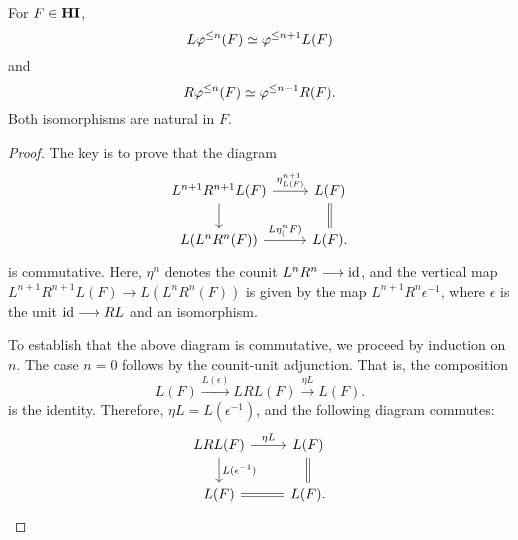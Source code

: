 \begin{prop}\label{prop_tl_L_R}
For $F \in \mathbf{HI}$, 
\[
L \varphi^{\leq n}(F) \simeq \varphi^{\leq n + 1} L(F)
\]
and
\[
R\varphi^{\leq n}(F) \simeq \varphi^{\leq n - 1}R(F).
\] 
Both isomorphisms are natural in $F$.
\end{prop}
\begin{proof}
The key is to prove that the diagram
\begin{equation}\label{eq_Ltl_com_diag}
\begin{tikzcd}
L^{n + 1}R^{n + 1}L(F) \arrow{r}{\eta^{n + 1}_{L(F)}} \arrow{d} &
L(F) \arrow[equals]{d} \\
L(L^{n}R^n(F)) \arrow{r}{L\eta^{n}_(F)} &
L(F).
\end{tikzcd}
\end{equation}
is commutative. Here, $\eta^n$ denotes the counit $L^nR^n \longrightarrow \mathrm{id}$,
and the vertical map $L^{n + 1}R^{n + 1}L(F) \to L(L^nR^n (F))$ is 
given by the map $L^{n + 1}R^n \epsilon^{-1}$, where $\epsilon$ is
the unit $\mathrm{id} \longrightarrow RL$ and an isomorphism.

To establish that the above diagram is commutative, we proceed by 
induction on $n$. The case $n = 0$ follows by the counit-unit 
adjunction. That is, the composition
\[
L(F) \stackrel{L(\epsilon)}{\to} LRL(F) \stackrel{\eta L}{\to} 
   L(F).
\]
is the identity. Therefore, $\eta L = L(\epsilon^{-1})$, and the
following diagram commutes:
\[
\begin{tikzcd}
LRL(F) \arrow{r}{\eta L} \arrow{d}{L(\epsilon^{-1})} &
L(F) \arrow[equals]{d} \\
L(F) \arrow[equals]{r} & L(F).
\end{tikzcd}
\]


\end{proof}
